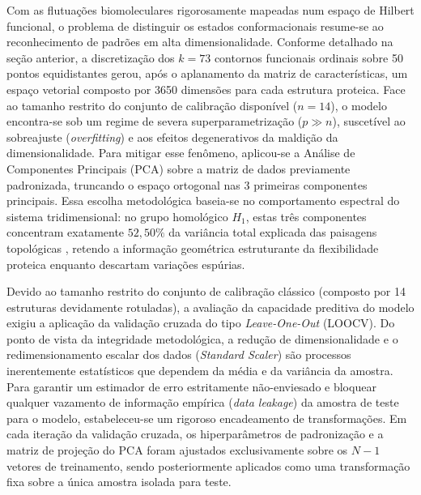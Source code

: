 \documentclass[12pt, a4paper]{article}
\theoremstyle{plain}
\theoremstyle{definition}
\theoremstyle{remark}
\newcommand{\ident}{\hspace{2em}}
\begin{document}
\ident Com as flutuações biomoleculares rigorosamente mapeadas num espaço de Hilbert funcional, o problema de distinguir os estados conformacionais resume-se ao reconhecimento de padrões em alta dimensionalidade. Conforme detalhado na seção anterior, a discretização dos $k=73$ contornos funcionais ordinais sobre 50 pontos equidistantes gerou, após o aplanamento da matriz de características, um espaço vetorial composto por 3650 dimensões para cada estrutura proteica. Face ao tamanho restrito do conjunto de calibração disponível ($n=14$), o modelo encontra-se sob um regime de severa superparametrização ($p \gg n$), suscetível ao sobreajuste (\textit{overfitting}) e aos efeitos degenerativos da maldição da dimensionalidade. Para mitigar esse fenômeno, aplicou-se a Análise de Componentes Principais (PCA) sobre a matriz de dados previamente padronizada, truncando o espaço ortogonal nas 3 primeiras componentes principais. Essa escolha metodológica baseia-se no comportamento espectral do sistema tridimensional: no grupo homológico $H_1$, estas três componentes concentram exatamente $52,50\%$ da variância total explicada das paisagens topológicas \cite{kovacev2016}, retendo a informação geométrica estruturante da flexibilidade proteica enquanto descartam variações espúrias.

\ident Devido ao tamanho restrito do conjunto de calibração clássico (composto por 14 estruturas devidamente rotuladas), a avaliação da capacidade preditiva do modelo exigiu a aplicação da validação cruzada do tipo \textit{Leave-One-Out} (LOOCV). Do ponto de vista da integridade metodológica, a redução de dimensionalidade e o redimensionamento escalar dos dados (\textit{Standard Scaler}) são processos inerentemente estatísticos que dependem da média e da variância da amostra. Para garantir um estimador de erro estritamente não-enviesado e bloquear qualquer vazamento de informação empírica (\textit{data leakage}) da amostra de teste para o modelo, estabeleceu-se um rigoroso encadeamento de transformações. Em cada iteração da validação cruzada, os hiperparâmetros de padronização e a matriz de projeção do PCA foram ajustados exclusivamente sobre os $N-1$ vetores de treinamento, sendo posteriormente aplicados como uma transformação fixa sobre a única amostra isolada para teste.
\end{document}
